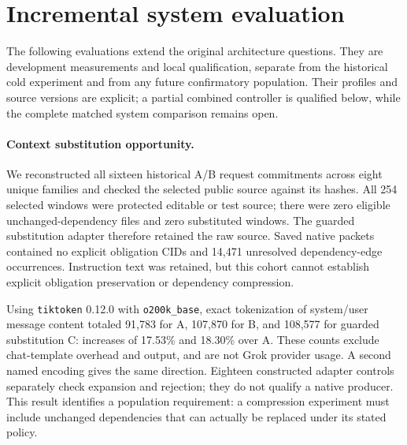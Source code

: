 \section{Incremental system evaluation}
\label{sec:incremental-evaluation}

The following evaluations extend the original architecture questions. They are
development measurements and local qualification, separate from the historical
cold experiment and from any future confirmatory population. Their profiles
and source versions are explicit; a partial combined controller is qualified
below, while the complete matched system comparison remains open.

\paragraph{Context substitution opportunity.}
We reconstructed all sixteen historical A/B request commitments across eight
unique families and checked the selected public source against its hashes.
All 254 selected windows were protected editable or test source; there were
zero eligible unchanged-dependency files and zero substituted windows.
The guarded substitution adapter therefore retained the raw source. Saved
native packets contained no explicit obligation CIDs and 14,471 unresolved
dependency-edge occurrences. Instruction text was retained, but this cohort
cannot establish explicit obligation preservation or dependency compression.

Using \texttt{tiktoken} 0.12.0 with \texttt{o200k\_base}, exact tokenization of
system/user message content totaled 91,783 for A, 107,870 for B, and 108,577 for
guarded substitution C: increases of 17.53\% and 18.30\% over A.
These counts exclude chat-template overhead and output, and are not Grok
provider usage. A second named encoding gives the same direction.
Eighteen constructed adapter controls separately check expansion and rejection;
they do not qualify a native producer. This result identifies a population
requirement: a compression experiment must include unchanged dependencies that
can actually be replaced under its stated policy.

